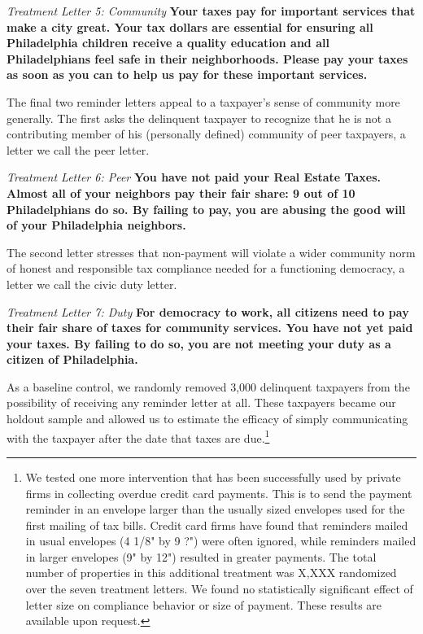 \documentclass[12pt]{article}
\begin{document}
{\it Treatment Letter 5: Community} {\bf Your taxes pay for important services that make a city
  great. Your tax dollars are essential for ensuring all Philadelphia
  children receive a quality education and all Philadelphians feel
  safe in their neighborhoods. Please pay your taxes as soon as you
  can to help us pay for these important services.}

The final two reminder letters appeal to a taxpayer's sense of
community more generally.  The first asks the delinquent taxpayer to
recognize that he is not a contributing member of his (personally
defined) community of peer taxpayers, a letter we call the peer
letter.  

{\it Treatment Letter 6: Peer } {\bf  You have not paid your Real Estate Taxes. Almost all of
  your neighbors pay their fair share: 9 out of 10 Philadelphians do
  so. By failing to pay, you are abusing the good will of your
  Philadelphia neighbors.}

The second letter stresses that non-payment will violate a wider
community norm of honest and responsible tax compliance needed for a
functioning democracy, a letter we call the civic duty letter. 

{\it Treatment Letter 7: Duty } {\bf For democracy to work, all citizens need to pay their fair
  share of taxes for community services. You have not yet paid your
  taxes. By failing to do so, you are not meeting your duty as a
  citizen of Philadelphia.}


As a baseline control, we randomly removed 3,000 delinquent taxpayers
from the possibility of receiving any reminder letter at all.  These
taxpayers became our holdout sample and allowed us to estimate the
efficacy of simply communicating with the taxpayer after the date that
taxes are due.\footnote{We tested one more intervention that has been
  successfully used by private firms in collecting overdue credit card
  payments.  This is to send the payment reminder in an envelope
  larger than the usually sized envelopes used for the first mailing
  of tax bills.  Credit card firms have found that reminders mailed in
  usual envelopes (4 1/8" by 9 ?") were often ignored, while reminders
  mailed in larger envelopes (9" by 12") resulted in greater payments.
  The total number of properties in this additional treatment was
  X,XXX randomized over the seven treatment letters.  We found no
  statistically significant effect of letter size on compliance
  behavior or size of payment.  These results are available upon
  request.}
	
\end{document}
